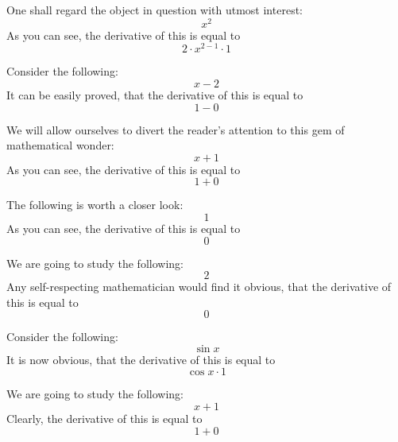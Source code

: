 \documentclass{article}
\begin{document}
One shall regard the object in question with utmost interest:
\begin{equation}
x ^{2 } 
\end{equation}
As you can see, the derivative of this is equal to
\begin{equation}
2 \cdot x ^{2 - 1 } \cdot 1 
\end{equation}

Consider the following:
\begin{equation}
x - 2 
\end{equation}
It can be easily proved, that the derivative of this is equal to
\begin{equation}
1 - 0 
\end{equation}

We will allow ourselves to divert the reader's attention to this gem of mathematical wonder:
\begin{equation}
x + 1 
\end{equation}
As you can see, the derivative of this is equal to
\begin{equation}
1 + 0 
\end{equation}

The following is worth a closer look:
\begin{equation}
1 
\end{equation}
As you can see, the derivative of this is equal to
\begin{equation}
0 
\end{equation}

We are going to study the following:
\begin{equation}
2 
\end{equation}
Any self-respecting mathematician would find it obvious, that the derivative of this is equal to
\begin{equation}
0 
\end{equation}

Consider the following:
\begin{equation}
\sin x 
\end{equation}
It is now obvious, that the derivative of this is equal to
\begin{equation}
\cos x \cdot 1 
\end{equation}

We are going to study the following:
\begin{equation}
x + 1 
\end{equation}
Clearly, the derivative of this is equal to
\begin{equation}
1 + 0 
\end{equation}
\end{document}
